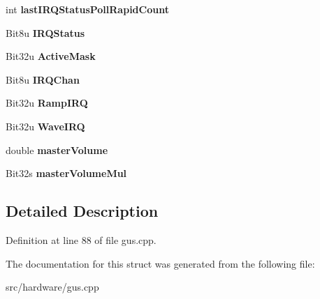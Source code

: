 \begin{DoxyCompactItemize}
\item 
\hypertarget{structGFGus_a7cf53be90ec9d8dfb4b22b3e004fd9cd}{int {\bfseries last\-I\-R\-Q\-Status\-Poll\-Rapid\-Count}}\label{structGFGus_a7cf53be90ec9d8dfb4b22b3e004fd9cd}

\item 
\hypertarget{structGFGus_af238c9e873d19d61f046063d83f111d1}{Bit8u {\bfseries I\-R\-Q\-Status}}\label{structGFGus_af238c9e873d19d61f046063d83f111d1}

\item 
\hypertarget{structGFGus_a2d78af798c38826042b4c8ef23ebe32f}{Bit32u {\bfseries Active\-Mask}}\label{structGFGus_a2d78af798c38826042b4c8ef23ebe32f}

\item 
\hypertarget{structGFGus_a4dcb3649a667a97aede4f09ded0ace2a}{Bit8u {\bfseries I\-R\-Q\-Chan}}\label{structGFGus_a4dcb3649a667a97aede4f09ded0ace2a}

\item 
\hypertarget{structGFGus_a6020128163cdd56bbb231a5c07630e24}{Bit32u {\bfseries Ramp\-I\-R\-Q}}\label{structGFGus_a6020128163cdd56bbb231a5c07630e24}

\item 
\hypertarget{structGFGus_aa5d5f4fadf04254e2d7d4c1e5b3ccffc}{Bit32u {\bfseries Wave\-I\-R\-Q}}\label{structGFGus_aa5d5f4fadf04254e2d7d4c1e5b3ccffc}

\item 
\hypertarget{structGFGus_a50fa87ed4026d42ccc1c854c0eab9c65}{double {\bfseries master\-Volume}}\label{structGFGus_a50fa87ed4026d42ccc1c854c0eab9c65}

\item 
\hypertarget{structGFGus_afaf9a55f59d75debcd2e17daf022fac6}{Bit32s {\bfseries master\-Volume\-Mul}}\label{structGFGus_afaf9a55f59d75debcd2e17daf022fac6}

\end{DoxyCompactItemize}


\subsection{Detailed Description}


Definition at line 88 of file gus.\-cpp.



The documentation for this struct was generated from the following file\-:\begin{DoxyCompactItemize}
\item 
src/hardware/gus.\-cpp\end{DoxyCompactItemize}
